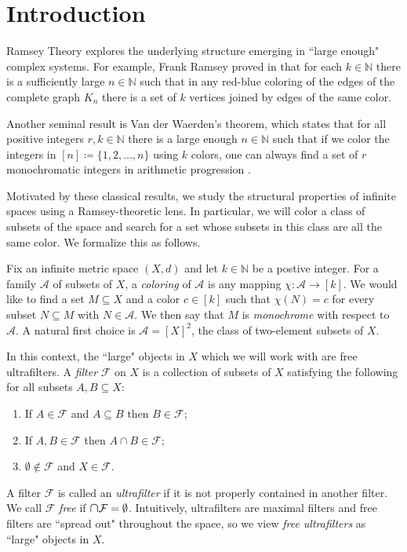\section{Introduction}
Ramsey Theory explores the underlying structure emerging in ``large enough" complex systems. For example, Frank Ramsey proved in \cite{ramsey:1930} that for each \( k \in \mathbb{N}  \) there is a sufficiently large \( n \in \mathbb{N}  \) such that in any red-blue coloring of the edges of the complete graph \( K_{n} \) there is a set of \( k \) vertices joined by edges of the same color.

Another seminal result is Van der Waerden's theorem, which states that for all positive integers \( r, k \in \mathbb{N}  \) there is a large enough \( n \in \mathbb{N}  \) such that if we color the integers in \( [n] \coloneqq \{ 1,2,\hdots ,n \}  \) using \( k \) colors, one can always find a set of \( r \) monochromatic integers in arithmetic progression \cite{waerden:1927}.

Motivated by these classical results, we study the structural properties of infinite spaces using a Ramsey-theoretic lens. In particular, we will color a class of subsets of the space and search for a set whose subsets in this class are all the same color. We formalize this as follows.

Fix an infinite metric space \( (X,d) \) and let \( k \in \mathbb{N}  \) be a postive integer. For a family \( \mathcal{A} \) of subsets of \( X \), a \emph{coloring} of \( \mathcal{A}  \) is any mapping \( \chi : \mathcal{A} \to [k] \). We would like to find a set \( M \subseteq X \) and a color \( c \in [k] \) such that \( \chi(N) = c \) for every subset \( N \subseteq M \) with \(N \in \mathcal{A}  \). We then say that \( M \) is \emph{monochrome} with respect to \( \mathcal{A}  \). A natural first choice is \( \mathcal{A} = [X]^{2}  \), the class of two-element subsets of \( X \).

In this context, the ``large" objects in \( X \) which we will work with are free ultrafilters. A \emph{filter} \( \mathcal{F}  \) on \( X \) is a collection of subsets of \( X \) satisfying the following for all subsets \( A, B \subseteq X \):
\begin{enumerate}[leftmargin=1.2cm]
	
	\item If \( A \in \mathcal{F} \) and \( A \subseteq B \) then \( B \in \mathcal{F}  \);
	\item If \( A, B \in \mathcal{F}  \) then \( A \cap B \in \mathcal{F}  \);
	\item \( \emptyset  \notin \mathcal{F}  \) and \( X \in \mathcal{F}  \).
\end{enumerate}
A filter \( \mathcal{F}  \) is called an \emph{ultrafilter} if it is not properly contained in another filter. We call \( \mathcal{F}  \) \emph{free} if \( \medcap \mathcal{F} = \emptyset  \). Intuitively, ultrafilters are maximal filters and free filters are ``spread out" throughout the space, so we view \emph{free ultrafilters} as ``large" objects in \( X \).

